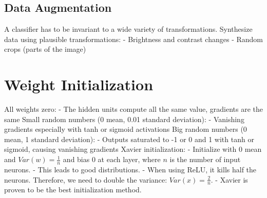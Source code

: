 \documentclass{scrartcl}
\begin{document}
\subsection*{Data Augmentation}
A classifier has to be invariant to a wide variety of transformations.
Synthesize data using plausible transformations:
- Brightness and contrast changes
- Random crops (parts of the image)


\section*{Weight Initialization}
All weights zero:
- The hidden units compute all the same value, gradients are the same
Small random numbers (0 mean, 0.01 standard deviation):
- Vanishing gradients especially with tanh or sigmoid activations
Big random numbers (0 mean, 1 standard deviation):
- Outputs saturated to -1 or 0 and 1 with tanh or sigmoid, causing vanishing gradients
Xavier initialization:
- Initialize with 0 mean and $Var(w) = \frac{1}{n}$ and bias 0 at each layer, where $n$ is the number of input neurons.
- This leads to good distributions.
- When using ReLU, it kills half the neurons. Therefore, we need to double the variance: $Var(x) = \frac{2}{n}$.
- Xavier is proven to be the best initialization method.
\end{document}
